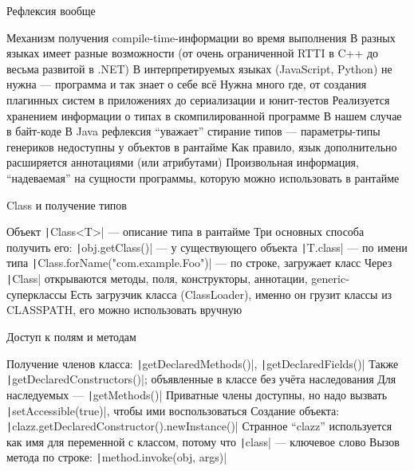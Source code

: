 \documentclass{../../slides-style}
\begin{document}
    \begin{frame}{Рефлексия вообще}
        \begin{outline}
            \1 Механизм получения compile-time-информации во время выполнения
            \1 В разных языках имеет разные возможности (от очень ограниченной RTTI в C++ до весьма развитой в .NET)
                \2 В интерпретируемых языках (JavaScript, Python) не нужна --- программа и так знает о себе всё
            \1 Нужна много где, от создания плагинных систем в приложениях до сериализации и юнит-тестов
            \1 Реализуется хранением информации о типах в скомпилированной программе
                \2 В нашем случае в байт-коде
                    \3 В Java рефлексия \enquote{уважает} стирание типов --- параметры-типы генериков недоступны у объектов в рантайме
            \1 Как правило, язык дополнительно расширяется аннотациями (или атрибутами)
                \2 Произвольная информация, \enquote{надеваемая} на сущности программы, которую можно использовать в рантайме
        \end{outline}
    \end{frame}

    \begin{frame}{Class и получение типов}
        \begin{outline}
            \1 Объект \texttt|Class<T>| --- описание типа в рантайме
            \1 Три основных способа получить его:
                \2 \texttt|obj.getClass()| --- у существующего объекта
                \2 \texttt|T.class| --- по имени типа
                \2 \texttt|Class.forName("com.example.Foo")| --- по строке, загружает класс
            \1 Через \texttt|Class| открываются методы, поля, конструкторы, аннотации, generic-суперклассы
            \1 Есть загрузчик класса (ClassLoader), именно он грузит классы из CLASSPATH, его можно использовать вручную
        \end{outline}
    \end{frame}

    \begin{frame}{Доступ к полям и методам}
        \begin{outline}
            \1 Получение членов класса:
                \2 \texttt|getDeclaredMethods()|, \texttt|getDeclaredFields()|
                \2 Также \texttt|getDeclaredConstructors()|; объявленные в классе без учёта наследования
                \2 Для наследуемых --- \texttt|getMethods()|
            \1 Приватные члены доступны, но надо вызвать \texttt|setAccessible(true)|, чтобы ими воспользоваться
            \1 Создание объекта: \texttt|clazz.getDeclaredConstructor().newInstance()|
                \2 Странное \enquote{clazz} используется как имя для переменной с классом, потому что \texttt|class| --- ключевое слово
            \1 Вызов метода по строке: \texttt|method.invoke(obj, args)|
        \end{outline}
    \end{frame}
\end{document}
